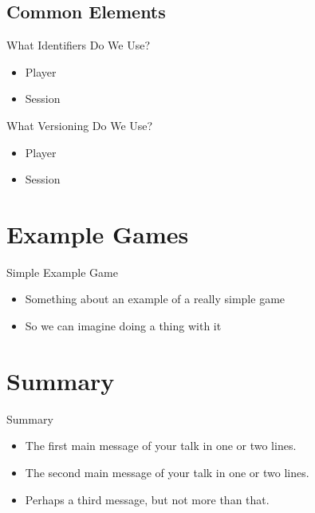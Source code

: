 \documentclass{beamer}
\begin{document}
\subsection[IDs]{Common Elements}

\begin{frame}{What Identifiers Do We Use?}
  \begin{itemize}
  \item Player
  \item Session
  \end{itemize}
\end{frame}

\begin{frame}{What Versioning Do We Use?}
  \begin{itemize}
  \item Player
  \item Session
  \end{itemize}
\end{frame}

\section[Examples]{Example Games}

\begin{frame}{Simple Example Game}
  \begin{itemize}
  \item Something about an example of a really simple game
  \item So we can imagine doing a thing with it
  \end{itemize}
\end{frame}

\section*{Summary}

\begin{frame}{Summary}
  \begin{itemize}
  \item
    The \alert{first main message} of your talk in one or two lines.
  \item
    The \alert{second main message} of your talk in one or two lines.
  \item
    Perhaps a \alert{third message}, but not more than that.
  \end{itemize}
\end{frame}
\end{document}
